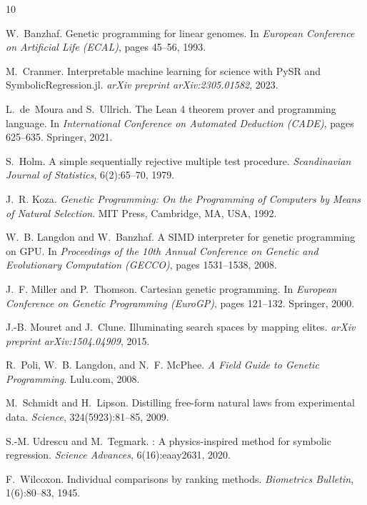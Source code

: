 \documentclass[11pt,a4paper]{article}
\begin{document}
\begin{thebibliography}{10}

W.~Banzhaf.
\newblock Genetic programming for linear genomes.
\newblock In \emph{European Conference on Artificial Life (ECAL)}, pages 45--56, 1993.

M.~Cranmer.
\newblock Interpretable machine learning for science with {PySR} and {SymbolicRegression.jl}.
\newblock \emph{arXiv preprint arXiv:2305.01582}, 2023.

L.~de~Moura and S.~Ullrich.
\newblock The {Lean 4} theorem prover and programming language.
\newblock In \emph{International Conference on Automated Deduction (CADE)}, pages 625--635. Springer, 2021.

S.~Holm.
\newblock A simple sequentially rejective multiple test procedure.
\newblock \emph{Scandinavian Journal of Statistics}, 6(2):65--70, 1979.

J.~R. Koza.
\newblock \emph{Genetic Programming: On the Programming of Computers by Means of Natural Selection}.
\newblock MIT Press, Cambridge, MA, USA, 1992.

W.~B. Langdon and W.~Banzhaf.
\newblock A {SIMD} interpreter for genetic programming on {GPU}.
\newblock In \emph{Proceedings of the 10th Annual Conference on Genetic and Evolutionary Computation (GECCO)}, pages 1531--1538, 2008.

J.~F. Miller and P.~Thomson.
\newblock Cartesian genetic programming.
\newblock In \emph{European Conference on Genetic Programming (EuroGP)}, pages 121--132. Springer, 2000.

J.-B. Mouret and J.~Clune.
\newblock Illuminating search spaces by mapping elites.
\newblock \emph{arXiv preprint arXiv:1504.04909}, 2015.

R.~Poli, W.~B. Langdon, and N.~F. McPhee.
\newblock \emph{A Field Guide to Genetic Programming}.
\newblock Lulu.com, 2008.

M.~Schmidt and H.~Lipson.
\newblock Distilling free-form natural laws from experimental data.
\newblock \emph{Science}, 324(5923):81--85, 2009.

S.-M. Udrescu and M.~Tegmark.
: A physics-inspired method for symbolic regression.
\newblock \emph{Science Advances}, 6(16):eaay2631, 2020.

F.~Wilcoxon.
\newblock Individual comparisons by ranking methods.
\newblock \emph{Biometrics Bulletin}, 1(6):80--83, 1945.

\end{thebibliography}
\end{document}
